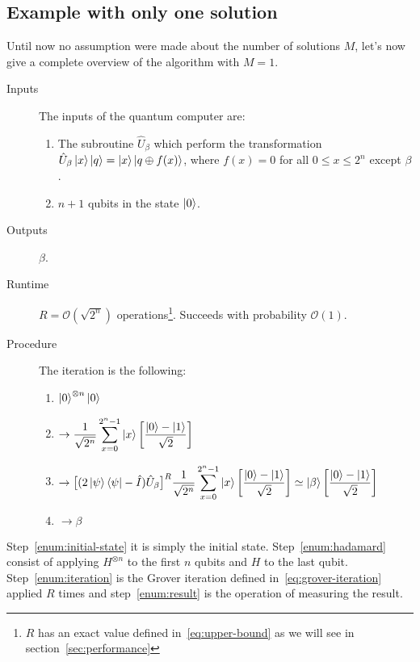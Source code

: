 \subsection{Example with only one solution}
Until now no assumption were made about the number of solutions $M$, let's now give a complete overview of the algorithm with $M=1$.
\begin{description}
   \item[Inputs] The inputs of the quantum computer are:
    \begin{enumerate}
  \item The subroutine $\hat{U}_\beta$ which perform the transformation $\hat{U}_\beta\ket{x}\ket{q} = \ket{x}\ket{q \oplus f(x)}$, where $f(x) = 0$ for all $0 \leq x \leq 2^n$ except $\beta$.
  \item $n+1$ qubits in the state $\ket{0}$.
\end{enumerate}
   \item[Outputs] $\beta$.
   \item[Runtime] $R = \mathcal{O}(\sqrt{2^n})$ operations\footnote{$R$ has an exact value defined in~\ref{eq:upper-bound} as we will see in section~\ref{sec:performance}}. Succeeds with probability $\mathcal{O}(1)$.
   \item[Procedure] The iteration is the following:
   \begin{enumerate}
  \item $\ket{0}^{\otimes n} \ket{0}$ \label{enum:initial-state}
  \item $\begin{aligned} \rightarrow \frac{1}{\sqrt{2^n}} \sum_{x=0}^{2^n-1}\ket{x} \biggl[\frac{\ket{0}-\ket{1}}{\sqrt{2}}\biggr] \end{aligned}$ \label{enum:hadamard}
  \item $\begin{aligned} \rightarrow \bigl[(2 \ket{\psi}\bra{\psi} - \hat{I})\hat{U}_\beta\bigr]^R \frac{1}{\sqrt{2^n}} \sum_{x=0}^{2^n-1}\ket{x} \biggl[\frac{\ket{0}-\ket{1}}{\sqrt{2}}\biggr] \simeq \ket{\beta} \biggl[\frac{\ket{0}-\ket{1}}{\sqrt{2}}\biggr] \end{aligned}$ \label{enum:iteration}
  \item $\rightarrow \beta$ \label{enum:result}
\end{enumerate}
\end{description}

Step~\ref{enum:initial-state} it is simply the initial state. Step~\ref{enum:hadamard} consist of applying $H^{\otimes n}$ to the first $n$ qubits and $H$ to the last qubit. Step~\ref{enum:iteration} is the Grover iteration defined in~\ref{eq:grover-iteration} applied $R$ times and step~\ref{enum:result} is the operation of measuring the result.


